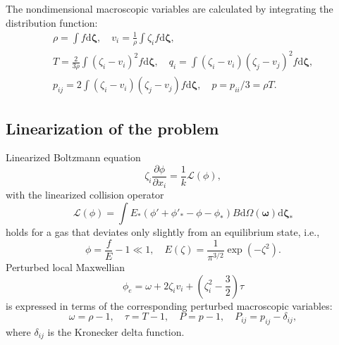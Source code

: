 \documentclass[review]{elsarticle}
\newcommand{\dd}{\mathrm{d}}
\newcommand{\pder}[2][]{\frac{\partial#1}{\partial#2}}
\newcommand{\dzeta}{\boldsymbol{\dd\zeta}}
\begin{document}
The nondimensional macroscopic variables are calculated by integrating the distribution function:
\begin{equation}\label{eq:macro}
    \begin{gathered}
    \rho = \int f \dzeta, \quad
    v_i = \frac1{\rho} \int \zeta_i f \dzeta, \\
    T = \frac{2}{3\rho}\int(\zeta_i-v_i)^2 f \dzeta, \quad
    q_i = \int(\zeta_i-v_i)(\zeta_j-v_j)^2 f \dzeta, \\
    p_{ij} = 2 \int(\zeta_i-v_i)(\zeta_j-v_j) f \dzeta,
        \quad p = p_{ii}/3 = \rho T.
    \end{gathered}
\end{equation}

\subsection{Linearization of the problem}

Linearized Boltzmann equation
\begin{equation}\label{eq:linear_Boltzmann}
    \zeta_i \pder[\phi]{x_i} = \frac1k \mathcal{L}(\phi),
\end{equation}
with the linearized collision operator
\begin{equation}\label{eq:linear_ci}
    \mathcal{L}(\phi) = \int E_*(\phi'+\phi'_*-\phi-\phi_*) B
    \dd \Omega(\boldsymbol{\omega}) \dzeta_*
\end{equation}
holds for a gas that deviates only slightly from an equilibrium state, i.e.,
\begin{equation}\label{eq:linear_condition}
    \phi = \frac{f}{E} - 1 \ll 1, \quad E(\zeta) = \frac1{\pi^{3/2}}\exp\left(-\zeta^2\right).
\end{equation}
Perturbed local Maxwellian
\begin{equation}\label{eq:linear_maxwellian}
    \phi_e = \omega + 2\zeta_i v_i + \left(\zeta_i^2-\frac32\right)\tau
\end{equation}
is expressed in terms of the corresponding perturbed macroscopic variables:
\begin{equation}\label{eq:perturbed_variables}
    \omega = \rho-1, \quad \tau = T-1, \quad P = p-1, \quad P_{ij} = p_{ij}-\delta_{ij},
\end{equation}
where \(\delta_{ij}\) is the Kronecker delta function.
\end{document}

